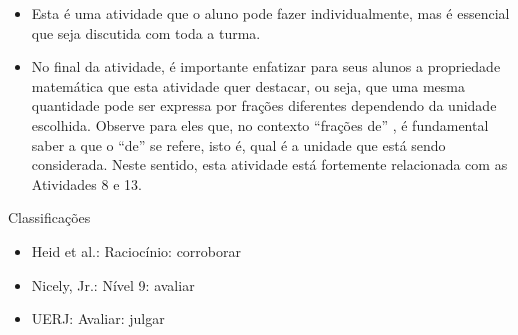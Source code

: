 \documentclass[oneside]{book}
\begin{document}
\begin{multicols}{2}
\begin{itemize} %
    \item       Esta é uma atividade que o aluno pode fazer individualmente, mas é essencial que seja discutida com toda a turma.
    \item       No final da atividade, é importante enfatizar para seus alunos a propriedade matemática que esta atividade quer destacar, ou seja, que uma mesma quantidade pode ser expressa por frações diferentes dependendo da unidade escolhida. Observe para eles que, no contexto       ``frações de''      , é fundamental saber a que o       ``de''       se refere, isto é, qual é a unidade que está sendo considerada. Neste sentido, esta atividade está fortemente relacionada com as Atividades 8 e 13.
\end{itemize} %


  Classificações
\begin{itemize} %
    \item       Heid et al.: Raciocínio: corroborar
    \item       Nicely, Jr.: Nível 9: avaliar
    \item       UERJ: Avaliar: julgar
\end{itemize} %



\end{multicols}
\end{document}
